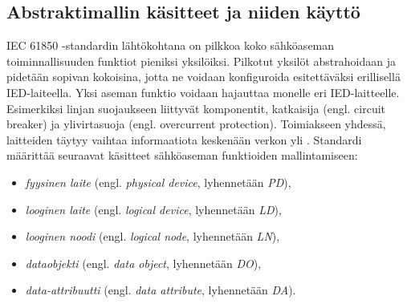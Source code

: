 \subsection{Abstraktimallin käsitteet ja niiden käyttö}
IEC 61850 -standardin lähtökohtana on pilkkoa koko sähköaseman toiminnallisuuden funktiot pieniksi yksilöiksi. Pilkotut yksilöt abstrahoidaan ja pidetään sopivan kokoisina, jotta ne voidaan konfiguroida esitettäväksi erillisellä IED-laiteella. Yksi aseman funktio voidaan hajauttaa monelle eri IED-laitteelle. Esimerkiksi linjan suojaukseen liittyvät komponentit, katkaisija (engl. circuit breaker) ja ylivirtasuoja (engl. overcurrent protection). Toimiakseen yhdessä, laitteiden täytyy vaihtaa informaatiota keskenään verkon yli \mbox{\cite[s.~31]{IEC61850-7-1}}. Standardi määrittää seuraavat käsitteet sähköaseman funktioiden mallintamiseen:
\begin{itemize}
	\item \emph{fyysinen laite} (engl. \emph{physical device}, lyhennetään \emph{PD}),
	\item \emph{looginen laite} (engl. \emph{logical device}, lyhennetään \emph{LD}),
	\item \emph{looginen noodi} (engl. \emph{logical node}, lyhennetään \emph{LN}),
	\item \emph{dataobjekti} (engl. \emph{data object}, lyhennetään \emph{DO}),
	\item \emph{data-attribuutti} (engl. \emph{data attribute}, lyhennetään \emph{DA}).
\end{itemize}
